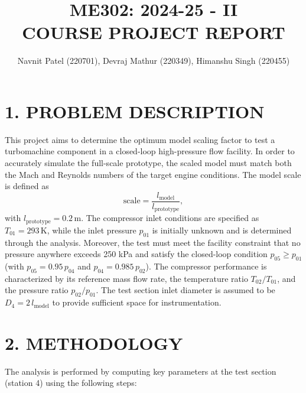 \documentclass[12pt]{article}
\title{\textbf{ME302: 2024-25 - II} \\ \textbf{COURSE PROJECT REPORT}}
\author{%
    Navnit Patel (220701),
    Devraj Mathur (220349),
    Himanshu Singh (220455)}
\date{}
\begin{document}
\maketitle

\section*{\large{1. PROBLEM DESCRIPTION}}
This project aims to determine the optimum model scaling factor to test a turbomachine component in a closed-loop high-pressure flow facility. In order to accurately simulate the full-scale prototype, the scaled model must match both the Mach and Reynolds numbers of the target engine conditions. The model scale is defined as
\[
\text{scale} = \frac{l_{\text{model}}}{l_{\text{prototype}}},
\]
with \(l_{\text{prototype}} = 0.2\,\text{m}\). The compressor inlet conditions are specified as \(T_{01}=293\,\text{K}\), while the inlet pressure \(p_{01}\) is initially unknown and is determined through the analysis. Moreover, the test must meet the facility constraint that no pressure anywhere exceeds 250 kPa and satisfy the closed-loop condition \(p_{05} \ge p_{01}\) (with \(p_{05}=0.95\,p_{04}\) and \(p_{04}=0.985\,p_{02}\)). The compressor performance is characterized by its reference mass flow rate, the temperature ratio \(T_{02}/T_{01}\), and the pressure ratio \(p_{02}/p_{01}\). The test section inlet diameter is assumed to be \(D_4 = 2\,l_{\text{model}}\) to provide sufficient space for instrumentation.

\section*{\large{2. METHODOLOGY}}
The analysis is performed by computing key parameters at the test section (station 4) using the following steps:
\end{document}
